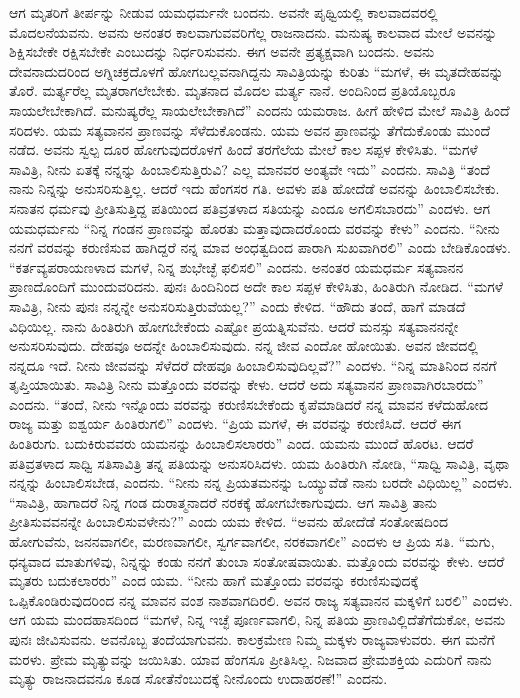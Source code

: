 ಆಗ ಮೃತರಿಗೆ ತೀರ್ಪನ್ನು ನೀಡುವ ಯಮಧರ್ಮನೇ ಬಂದನು. ಅವನೇ ಪೃಥ್ವಿಯಲ್ಲಿ ಕಾಲವಾದವರಲ್ಲಿ ಮೊದಲನೆಯವನು. ಅವನು ಅನಂತರ ಕಾಲವಾಗುವವರಿಗೆಲ್ಲ ರಾಜನಾದನು. ಮನುಷ್ಯ ಕಾಲವಾದ ಮೇಲೆ ಅವನನ್ನು ಶಿಕ್ಷಿಸಬೇಕೇ ರಕ್ಷಿಸಬೇಕೇ ಎಂಬುದನ್ನು ನಿರ್ಧರಿಸುವನು. ಈಗ ಅವನೇ ಪ್ರತ್ಯಕ್ಷವಾಗಿ ಬಂದನು. ಅವನು ದೇವನಾದುದ\break ರಿಂದ ಅಗ್ನಿಚಕ್ರದೊಳಗೆ ಹೋಗಬಲ್ಲವನಾಗಿದ್ದನು ಸಾವಿತ್ರಿಯನ್ನು ಕುರಿತು “ಮಗಳೆ, ಈ ಮೃತದೇಹವನ್ನು ತೊರೆ. ಮರ್ತ್ಯರೆಲ್ಲ ಮೃತರಾಗಲೇಬೇಕು. ಮೃತನಾದ ಮೊದಲ ಮರ್ತ್ಯ ನಾನೆ. ಅಂದಿನಿಂದ ಪ್ರತಿಯೊಬ್ಬರೂ ಸಾಯಲೇಬೇಕಾಗಿದೆ. ಮನುಷ್ಯರೆಲ್ಲ ಸಾಯಲೇಬೇಕಾಗಿದೆ” ಎಂದನು ಯಮರಾಜ. ಹೀಗೆ ಹೇಳಿದ ಮೇಲೆ ಸಾವಿತ್ರಿ ಹಿಂದೆ ಸರಿದಳು. ಯಮ ಸತ್ಯವಾನನ ಪ್ರಾಣವನ್ನು ಸೆಳೆದುಕೊಂಡನು. ಯಮ ಅವನ ಪ್ರಾಣವನ್ನು ತೆಗೆದುಕೊಂಡು ಮುಂದೆ ನಡೆದ. ಅವನು ಸ್ವಲ್ಪ ದೂರ ಹೋಗುವುದರೊಳಗೆ ಹಿಂದೆ ತರಗೆಲೆಯ ಮೇಲೆ ಕಾಲ ಸಪ್ಪಳ ಕೇಳಿಸಿತು. “ಮಗಳೆ ಸಾವಿತ್ರಿ, ನೀನು ಏತಕ್ಕೆ ನನ್ನನ್ನು ಹಿಂಬಾಲಿಸುತ್ತಿರುವಿ? ಎಲ್ಲ ಮಾನವರ ಅಂತ್ಯವೇ ಇದು” ಎಂದನು. ಸಾವಿತ್ರಿ “ತಂದೆ ನಾನು ನಿನ್ನನ್ನು ಅನುಸರಿಸುತ್ತಿಲ್ಲ. ಆದರೆ ಇದು ಹೆಂಗಸರ ಗತಿ. ಅವಳು ಪತಿ ಹೋದೆಡೆ ಅವನನ್ನು ಹಿಂಬಾಲಿಸಬೇಕು. ಸನಾತನ ಧರ್ಮವು ಪ್ರೀತಿಸುತ್ತಿದ್ದ ಪತಿಯಿಂದ ಪತಿವ್ರತಳಾದ ಸತಿಯನ್ನು ಎಂದೂ ಅಗಲಿಸಬಾರದು” ಎಂದಳು. ಆಗ ಯಮಧರ್ಮನು “ನಿನ್ನ ಗಂಡನ ಪ್ರಾಣವನ್ನು ಹೊರತು ಮತ್ತಾವುದಾದರೊಂದು ವರವನ್ನು ಕೇಳು” ಎಂದನು. “ನೀನು ನನಗೆ ವರವನ್ನು ಕರುಣಿಸುವ ಹಾಗಿದ್ದರೆ ನನ್ನ ಮಾವ ಅಂಧತ್ವದಿಂದ ಪಾರಾಗಿ ಸುಖವಾಗಿರಲಿ” ಎಂದು ಬೇಡಿಕೊಂಡಳು. “ಕರ್ತವ್ಯಪರಾಯಣಳಾದ ಮಗಳೆ, ನಿನ್ನ ಶುಭೇಚ್ಛೆ ಫಲಿಸಲಿ” ಎಂದನು. ಅನಂತರ ಯಮಧರ್ಮ ಸತ್ಯವಾನನ ಪ್ರಾಣದೊಂದಿಗೆ ಮುಂದುವರಿದನು. ಪುನಃ ಹಿಂದಿನಿಂದ ಅದೇ ಕಾಲ ಸಪ್ಪಳ ಕೇಳಿಸಿತು, ಹಿಂತಿರುಗಿ ನೋಡಿದ. “ಮಗಳೆ ಸಾವಿತ್ರಿ, ನೀನು ಪುನಃ ನನ್ನನ್ನೇ ಅನುಸರಿಸುತ್ತಿರುವೆಯಲ್ಲ?” ಎಂದು ಕೇಳಿದ. “ಹೌದು ತಂದೆ, ಹಾಗೆ ಮಾಡದೆ ವಿಧಿಯಿಲ್ಲ. ನಾನು ಹಿಂತಿರುಗಿ ಹೋಗಬೇಕೆಂದು ಎಷ್ಟೋ ಪ್ರಯತ್ನಿಸುವೆನು. ಆದರೆ ಮನಸ್ಸು ಸತ್ಯವಾನನನ್ನೇ ಅನುಸರಿಸುವುದು. ದೇಹವೂ ಅದನ್ನೇ ಹಿಂಬಾಲಿಸುವುದು. ನನ್ನ ಜೀವ ಎಂದೋ ಹೋಯಿತು. ಅವನ ಜೀವದಲ್ಲಿ ನನ್ನದೂ ಇದೆ. ನೀನು ಜೀವವನ್ನು ಸೆಳೆದರೆ ದೇಹವೂ ಹಿಂಬಾಲಿಸುವುದಿಲ್ಲವೆ?” ಎಂದಳು. “ನಿನ್ನ ಮಾತಿನಿಂದ ನನಗೆ ತೃಪ್ತಿಯಾಯಿತು. ಸಾವಿತ್ರಿ ನೀನು ಮತ್ತೊಂದು ವರವನ್ನು ಕೇಳು. ಆದರೆ ಅದು ಸತ್ಯವಾನನ ಪ್ರಾಣವಾಗಿರಬಾರದು” ಎಂದನು. “ತಂದೆ, ನೀನು ಇನ್ನೊಂದು ವರವನ್ನು ಕರುಣಿಸಬೇಕೆಂದು ಕೃಪೆಮಾಡಿದರೆ ನನ್ನ ಮಾವನ ಕಳೆದುಹೋದ ರಾಜ್ಯ ಮತ್ತು ಐಶ್ವರ್ಯ ಹಿಂತಿರುಗಲಿ” ಎಂದಳು. “ಪ್ರಿಯ ಮಗಳೆ, ಈ ವರವನ್ನು ಕರುಣಿಸಿದೆ. ಆದರೆ ಈಗ ಹಿಂತಿರುಗು. ಬದುಕಿರುವವರು ಯಮನನ್ನು ಹಿಂಬಾಲಿಸಲಾರರು” ಎಂದ. ಯಮನು ಮುಂದೆ ಹೊರಟ. ಆದರೆ ಪತಿವ್ರತಳಾದ ಸಾಧ್ವಿ ಸತಿಸಾವಿತ್ರಿ ತನ್ನ ಪತಿಯನ್ನು ಅನುಸರಿಸಿದಳು. ಯಮ ಹಿಂತಿರುಗಿ ನೋಡಿ, “ಸಾಧ್ವಿ ಸಾವಿತ್ರಿ, ವೃಥಾ ನನ್ನನ್ನು ಹಿಂಬಾಲಿಸಬೇಡ, ಎಂದನು. “ನೀನು ನನ್ನ ಪ್ರಿಯತಮನನ್ನು ಒಯ್ಯುವೆಡೆ ನಾನು ಬರದೇ ವಿಧಿಯಿಲ್ಲ” ಎಂದಳು. “ಸಾವಿತ್ರಿ, ಹಾಗಾದರೆ ನಿನ್ನ ಗಂಡ ದುರಾತ್ಮನಾದರೆ ನರಕಕ್ಕೆ ಹೋಗಬೇಕಾಗುವುದು. ಆಗ ಸಾವಿತ್ರಿ ತಾನು ಪ್ರೀತಿಸುವವನನ್ನೇ ಹಿಂಬಾಲಿಸುವಳೇನು?” ಎಂದು ಯಮ ಕೇಳಿದ. “ಅವನು ಹೋದೆಡೆ ಸಂತೋಷದಿಂದ ಹೋಗುವೆನು, ಜನನವಾಗಲೀ, ಮರಣವಾಗಲೀ, ಸ್ವರ್ಗವಾಗಲೀ, ನರಕವಾಗಲೀ” ಎಂದಳು ಆ ಪ್ರಿಯ ಸತಿ. “ಮಗು, ಧನ್ಯವಾದ ಮಾತುಗಳಿವು, ನಿನ್ನನ್ನು ಕಂಡು ನನಗೆ ತುಂಬಾ ಸಂತೋಷವಾಯಿತು. ಮತ್ತೊಂದು ವರವನ್ನು ಕೇಳು. ಆದರೆ ಮೃತರು ಬದುಕಲಾರರು” ಎಂದ ಯಮ. “ನೀನು ಹಾಗೆ ಮತ್ತೊಂದು ವರವನ್ನು ಕರುಣಿಸುವುದಕ್ಕೆ ಒಪ್ಪಿಕೊಂಡಿರುವುದರಿಂದ ನನ್ನ ಮಾವನ ವಂಶ ನಾಶವಾಗದಿರಲಿ. ಅವನ ರಾಜ್ಯ ಸತ್ಯವಾನನ ಮಕ್ಕಳಿಗೆ ಬರಲಿ” ಎಂದಳು. ಆಗ ಯಮ ಮಂದಹಾಸದಿಂದ “ಮಗಳೆ, ನಿನ್ನ ಇಚ್ಛೆ ಪೂರ್ಣವಾಗಲಿ, ನಿನ್ನ ಪತಿಯ ಪ್ರಾಣವಿಲ್ಲಿದೆ\break ತೆಗೆದುಕೋ, ಅವನು ಪುನಃ ಜೀವಿಸುವನು. ಅವನೊಬ್ಬ ತಂದೆಯಾಗುವನು. ಕಾಲಕ್ರಮೇಣ ನಿಮ್ಮ ಮಕ್ಕಳು ರಾಜ್ಯವಾಳುವರು. ಈಗ ಮನೆಗೆ ಮರಳು. ಪ್ರೇಮ ಮೃತ್ಯುವನ್ನು ಜಯಿಸಿತು. ಯಾವ ಹೆಂಗಸೂ ಪ್ರೀತಿಸಿಲ್ಲ. ನಿಜವಾದ ಪ್ರೇಮಶಕ್ತಿಯ ಎದುರಿಗೆ ನಾನು ಮೃತ್ಯು ರಾಜನಾದವನೂ ಕೂಡ ಸೋತೆನೆಂಬುದಕ್ಕೆ ನೀನೊಂದು ಉದಾಹರಣೆ!” ಎಂದನು.

